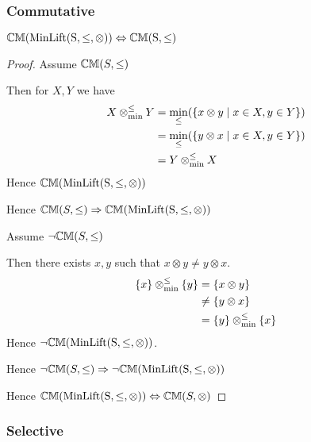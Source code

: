 \documentclass[../Summary.tex]{subfiles}
\begin{document}
\subsubsection{Commutative}

\begin{theorem} \label{thm:minlift_cm}
${\mathbb{CM}}(\mathrm{MinLift(S,\leq,\otimes)}) \Leftrightarrow {\mathbb{CM}}\mathrm{(S,\leq)}$
\end{theorem}

\begin{proof}

\vspace{0.5em}

Assume ${\mathbb{CM}}(S,\leq)$

\begin{ind}
Then for $X,Y$ we have
\begin{align*}
X \mathbin{\otimes_{\min}^{\leq}} Y 	& = \min_\leq(\{x \otimes y \mid x \in X, y \in Y\}) \\
				& = \min_\leq(\{y \otimes x \mid x \in X, y \in Y\}) \\
				& = Y \mathbin{\otimes_{\min}^{\leq}} X
\end{align*}
Hence ${\mathbb{CM}}(\mathrm{MinLift(S,\leq,\otimes)})$
\end{ind}

Hence ${\mathbb{CM}}(S,\leq) \Rightarrow {\mathbb{CM}}(\mathrm{MinLift(S,\leq,\otimes)})$

\vspace{2em}

Assume $\neg {\mathbb{CM}}(S,\leq)$

\begin{ind}
Then there exists $x,y$ such that $x \otimes y \neq y \otimes x$.
\begin{align*}
\{ x \} \mathbin{\otimes_{\min}^{\leq}} \{ y \} 	& = \{x \otimes y\} \\	
							& \neq \{ y \otimes x \} \\
							& = \{ y \} \mathbin{\otimes_{\min}^{\leq}} \{ x \}
\end{align*}
Hence $\neg {\mathbb{CM}}(\mathrm{MinLift(S,\leq,\otimes)})$.
\end{ind}
Hence $\neg {\mathbb{CM}}(S,\leq) \Rightarrow \neg {\mathbb{CM}}(\mathrm{MinLift(S,\leq,\otimes)})$

\vspace{2em}

Hence ${\mathbb{CM}}(\mathrm{MinLift(S,\leq,\otimes)}) \Leftrightarrow {\mathbb{CM}}(S,\otimes)$
\end{proof}

\subsubsection{Selective}
\end{document}
